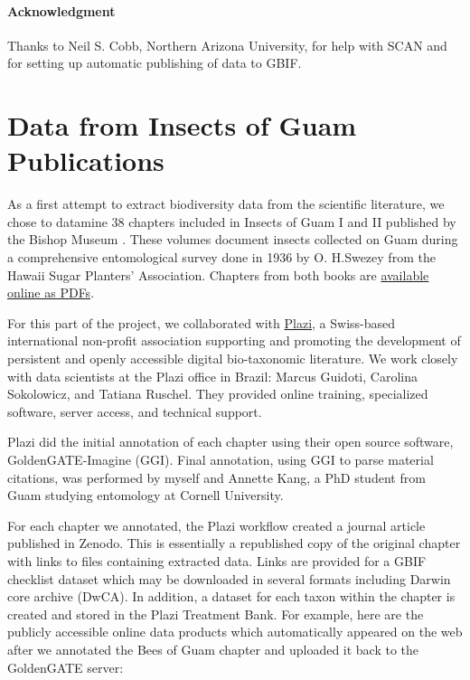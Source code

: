 \documentclass[12pt,letterpaper,english,bibliography=totocnumbered, abstract=on]{scrartcl}
\begin{document}
\paragraph{Acknowledgment} Thanks to Neil S. Cobb, Northern Arizona University, for help with SCAN and for setting up automatic publishing of data to GBIF.





\pagebreak
\section{Data from Insects of Guam Publications}
\newrefsection[my.bib]

As a first attempt to extract biodiversity data from the scientific literature, we chose to datamine 38 chapters included in Insects of Guam I and II published by the Bishop Museum \cite{swezey1942insects, swezey1946insects}. These volumes document insects collected on Guam during a comprehensive entomological survey done in 1936 by O. H.Swezey from the Hawaii Sugar Planters' Association. Chapters from both books are \href{http://hbs.bishopmuseum.org/pubs-online/bpbm-bulletins.html}{available online as PDFs}.

For this part of the project, we collaborated with \href{https://en.wikipedia.org/wiki/Plazi}{Plazi}, a Swiss-based international non-profit association supporting and promoting the development of persistent and openly accessible digital bio-taxonomic literature. We work closely with data scientists at the Plazi office in Brazil: Marcus Guidoti, Carolina Sokolowicz, and Tatiana Ruschel. They provided online training, specialized software, server access, and technical support.

Plazi did the initial annotation of each chapter using their open source software, GoldenGATE-Imagine (GGI). Final annotation, using GGI to parse material citations, was performed by myself and Annette Kang, a PhD student from Guam studying entomology at Cornell University.

For each chapter we annotated, the Plazi workflow created a journal article published in Zenodo. This is essentially a republished copy of the original chapter with links to files containing extracted data. Links are provided for a GBIF checklist dataset which may be downloaded in several formats including Darwin core archive (DwCA). In addition, a dataset for each taxon within the chapter is created and stored in the Plazi Treatment Bank. For example, here are the publicly accessible online data products which automatically appeared on the web after we annotated the Bees of Guam chapter and uploaded it back to the GoldenGATE server:
\end{document}
